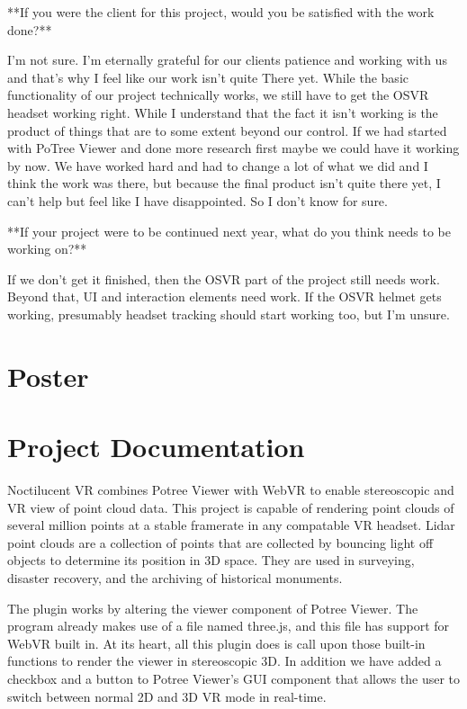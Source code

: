 \documentclass[draftclsnofoot,onecolumn]{IEEEtran}
\begin{document}
**If you were the client for this project, would you be satisfied with the work done?**

I'm not sure. I'm eternally grateful for our clients patience and working with us and that's why I feel like our work isn't quite There yet. While the basic functionality of our project technically works, we still have to get the OSVR headset working right. While I understand that the fact it isn't working is the product of things that are to some extent beyond our control. If we had started with PoTree Viewer and done more research first maybe we could have it working by now. We have worked hard and had to change a lot of what we did and I think the work was there, but because the final product isn't quite there yet, I can't help but feel like I have disappointed. So I don't know for sure.

**If your project were to be continued next year, what do you think needs to be working on?**

If we don't get it finished, then the OSVR part of the project still needs work. Beyond that, UI and interaction elements need work. If the OSVR helmet gets working, presumably headset tracking should start working too, but I'm unsure. 

\section{Poster}

\section{Project Documentation}

Noctilucent VR combines Potree Viewer with WebVR to enable stereoscopic and VR view of point cloud data. 
This project is capable of rendering point clouds of several million points at a stable framerate in any compatable VR headset. 
Lidar point clouds are a collection of points that are collected by bouncing light off objects to determine its position in 3D space. 
They are used in surveying, disaster recovery, and the archiving of historical monuments.

The plugin works by altering the viewer component of Potree Viewer. 
The program already makes use of a file named three.js, and this file has support for WebVR built in. 
At its heart, all this plugin does is call upon those built-in functions to render the viewer in stereoscopic 3D. 
In addition we have added a checkbox and a button to Potree Viewer's GUI component that allows the user to switch between normal 2D and 3D VR mode in real-time.
\end{document}

